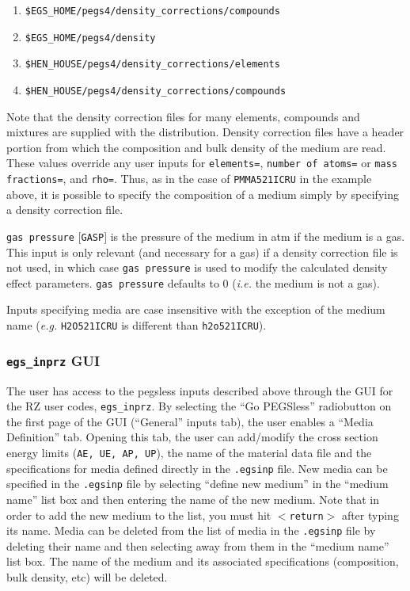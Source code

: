 \documentclass[12pt,twoside]{article}  %
\begin{document}
\begin{description}
\begin{description}
\begin{enumerate}
\item {\tt \$EGS\_HOME/pegs4/density\_corrections/compounds}
\item {\tt \$EGS\_HOME/pegs4/density}
\item {\tt \$HEN\_HOUSE/pegs4/density\_corrections/elements}
\item {\tt \$HEN\_HOUSE/pegs4/density\_corrections/compounds}
\end{enumerate}
Note that the density correction files for many elements, compounds
and mixtures are supplied with
the distribution.  Density correction files have a header portion from which the composition and bulk density of the medium are read.  These values override
any user inputs for {\tt elements=}, {\tt number of atoms=} or {\tt mass fractions=}, and {\tt rho=}.  Thus, as in the case of
{\tt PMMA521ICRU} in the example above, it is possible to specify the composition
of a medium simply by specifying a density correction file.
\item {\tt gas pressure} $[${\tt GASP}$]$ is the pressure of the medium in atm
if the medium is a gas.  This input is only relevant (and necessary
for a gas) if
a density correction file is not used, in which case {\tt gas pressure} is used to modify the calculated density effect parameters.
{\tt gas pressure} defaults to 0 ({\em i.e.} the medium is not a gas).
\end{description}
\end{description}

Inputs specifying media are case insensitive with the exception of the medium name ({\it e.g.} {\tt H2O521ICRU} is
different than {\tt h2o521ICRU}).

\subsubsection{{\tt egs\_inprz} GUI}
The user has access to the pegsless inputs described above through the GUI for the RZ user codes, {\tt egs\_inprz}.
By selecting the ``Go PEGSless'' radiobutton on the first page of the GUI (``General'' inputs tab), the user enables
a ``Media Definition'' tab.  Opening this tab, the user can add/modify the cross section energy limits ({\tt AE, UE, AP, UP}),
the name of the material data file and the specifications for media defined directly in the {\tt .egsinp} file.  New media
can be specified in the {\tt .egsinp} file by selecting ``define new medium'' in the ``medium name'' list box and then entering the
name of the new medium.  Note that in order to add the new medium to the list, you must hit {\tt $<$return$>$} after
typing its name.  Media can be deleted from the list of media in the {\tt .egsinp} file by deleting their name and then
selecting away from them in the ``medium name'' list box.  The name of the medium and its associated specifications
(composition, bulk density, etc) will be deleted.
\end{document}
